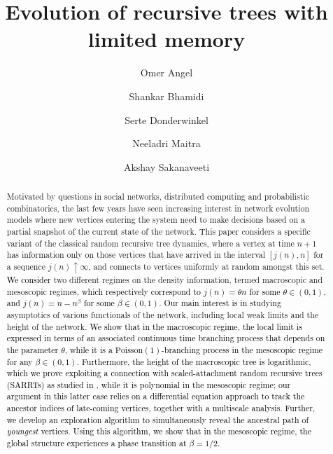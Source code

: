\documentclass[letterpaper,11pt,reqno]{amsart}
\theoremstyle{definition}
\begin{document}
\title[Evolution of recursive trees with limited memory]{Evolution of recursive trees with limited memory}

\author[Angel]{Omer Angel}
\address{Department of Mathematics, University of British Columbia.}
\author[Bhamidi]{Shankar Bhamidi}
\address{Department of Statistics and Operations Research, University of North Carolina at Chapel Hill.}
\author[Donderwinkel]{Serte Donderwinkel}
\address{Bernoulli Institute of Mathematics, University of Groningen.}
\author[Maitra]{Neeladri Maitra}
\address{Department of Mathematics, University of Illinois at Urbana-Champaign.}
\author[Sakanaveeti]{Akshay Sakanaveeti}
\address{Department of Statistics and Operations Research, University of North Carolina at Chapel Hill.}

\date{}

	
\begin{abstract}
	Motivated by questions in social networks, distributed computing and probabilistic combinatorics, the last few years have seen increasing interest in network evolution models where new vertices entering the system need to make decisions based on a partial snapshot of the current state of the network. This paper considers a specific variant of the classical random recursive tree dynamics,  where a vertex at time $n+1$ has information only on those vertices that have arrived in the interval $[j(n), n]$ for a sequence $j(n) \uparrow \infty$, and connects to vertices uniformly at random amongst this set. \textcolor{black}{We consider} two different regimes on the density information, termed macroscopic and mesoscopic regimes, \textcolor{black}{which respectively correspond to $j(n)=\theta n$ for some $\theta \in (0,1)$, and $j(n)=n-n^{\beta}$ for some $\beta \in (0,1)$.} \textcolor{black}{Our main interest is in studying} asymptotics of various functionals of the network, including local weak limits and the height of the network. \textcolor{black}{We show that in the macroscopic regime, the local limit is expressed in terms of an associated continuous time branching process that depends on the parameter $\theta$, while it is a $\mathrm{Poisson}(1)$-branching process in the mesoscopic regime for any $\beta \in (0,1)$. Furthermore, the height of the macroscopic tree is logarithmic, which we prove exploiting a connection with scaled-attachment random recursive trees (SARRTs) as studied in \cite{devroye2012depth}, while it is polynomial in the mesoscopic regime; our argument in this latter case relies on a differential equation approach to track the ancestor indices of late-coming vertices, together with a multiscale analysis. {Further, we develop an exploration algorithm to simultaneously reveal the ancestral path of \emph{youngest} vertices. Using this algorithm, we show that in the mesoscopic regime, the global structure experiences a phase transition at $\beta=1/2$.}} 	 
\end{abstract}
	
\end{document}
